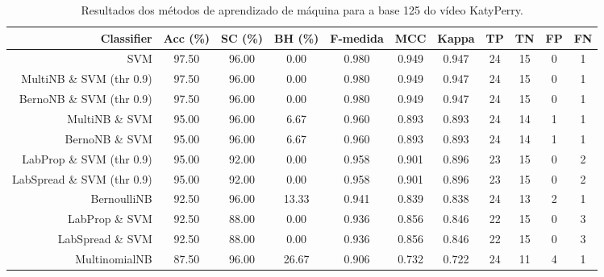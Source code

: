 \begin{table}[!htb]
\centering
\caption{Resultados dos métodos de aprendizado de máquina para a base 125 do vídeo KatyPerry.}
\label{tab:KatyPerry-125}
\begin{tabular}{r|c|c|c|c|c|c|c|c|c|c}
\hline\hline
Classifier & Acc (\%) & SC (\%) & BH (\%) & F-medida & MCC & Kappa & TP & TN & FP & FN \\ \hline
SVM & 97.50 & 96.00 & 0.00 & 0.980 & 0.949 & 0.947 & 24 & 15 & 0 & 1 \\ 
MultiNB \& SVM (thr 0.9) & 97.50 & 96.00 & 0.00 & 0.980 & 0.949 & 0.947 & 24 & 15 & 0 & 1 \\ 
BernoNB \& SVM (thr 0.9) & 97.50 & 96.00 & 0.00 & 0.980 & 0.949 & 0.947 & 24 & 15 & 0 & 1 \\ 
MultiNB \& SVM & 95.00 & 96.00 & 6.67 & 0.960 & 0.893 & 0.893 & 24 & 14 & 1 & 1 \\ 
BernoNB \& SVM & 95.00 & 96.00 & 6.67 & 0.960 & 0.893 & 0.893 & 24 & 14 & 1 & 1 \\ 
LabProp \& SVM (thr 0.9) & 95.00 & 92.00 & 0.00 & 0.958 & 0.901 & 0.896 & 23 & 15 & 0 & 2 \\ 
LabSpread \& SVM (thr 0.9) & 95.00 & 92.00 & 0.00 & 0.958 & 0.901 & 0.896 & 23 & 15 & 0 & 2 \\ 
BernoulliNB & 92.50 & 96.00 & 13.33 & 0.941 & 0.839 & 0.838 & 24 & 13 & 2 & 1 \\ 
LabProp \& SVM & 92.50 & 88.00 & 0.00 & 0.936 & 0.856 & 0.846 & 22 & 15 & 0 & 3 \\ 
LabSpread \& SVM & 92.50 & 88.00 & 0.00 & 0.936 & 0.856 & 0.846 & 22 & 15 & 0 & 3 \\ 
MultinomialNB & 87.50 & 96.00 & 26.67 & 0.906 & 0.732 & 0.722 & 24 & 11 & 4 & 1 \\ 
\hline\hline
\end{tabular}
\end{table}
